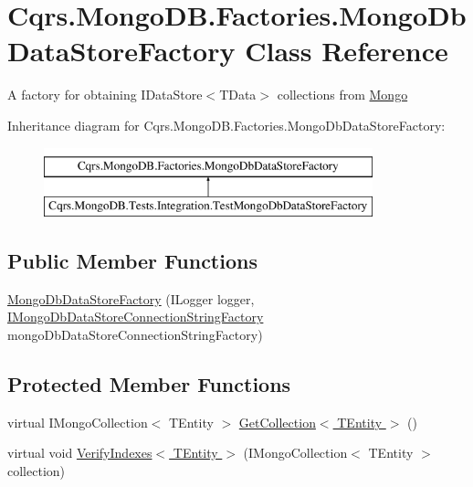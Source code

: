 \hypertarget{classCqrs_1_1MongoDB_1_1Factories_1_1MongoDbDataStoreFactory}{}\section{Cqrs.\+Mongo\+D\+B.\+Factories.\+Mongo\+Db\+Data\+Store\+Factory Class Reference}
\label{classCqrs_1_1MongoDB_1_1Factories_1_1MongoDbDataStoreFactory}


A factory for obtaining I\+Data\+Store$<$\+T\+Data$>$ collections from \hyperlink{namespaceCqrs_1_1Mongo}{Mongo}  


Inheritance diagram for Cqrs.\+Mongo\+D\+B.\+Factories.\+Mongo\+Db\+Data\+Store\+Factory\+:\begin{figure}[H]
\begin{center}
\leavevmode
\includegraphics[height=2.000000cm]{classCqrs_1_1MongoDB_1_1Factories_1_1MongoDbDataStoreFactory}
\end{center}
\end{figure}
\subsection*{Public Member Functions}
\begin{DoxyCompactItemize}
\item 
\hyperlink{classCqrs_1_1MongoDB_1_1Factories_1_1MongoDbDataStoreFactory_a5306704647ba6dab35844231ca999b7e_a5306704647ba6dab35844231ca999b7e}{Mongo\+Db\+Data\+Store\+Factory} (I\+Logger logger, \hyperlink{interfaceCqrs_1_1MongoDB_1_1Factories_1_1IMongoDbDataStoreConnectionStringFactory}{I\+Mongo\+Db\+Data\+Store\+Connection\+String\+Factory} mongo\+Db\+Data\+Store\+Connection\+String\+Factory)
\end{DoxyCompactItemize}
\subsection*{Protected Member Functions}
\begin{DoxyCompactItemize}
\item 
virtual I\+Mongo\+Collection$<$ T\+Entity $>$ \hyperlink{classCqrs_1_1MongoDB_1_1Factories_1_1MongoDbDataStoreFactory_ab1b732065a4369b09851119969a4815f_ab1b732065a4369b09851119969a4815f}{Get\+Collection$<$ T\+Entity $>$} ()
\item 
virtual void \hyperlink{classCqrs_1_1MongoDB_1_1Factories_1_1MongoDbDataStoreFactory_a1be5e7f0670e120c5105ff96d9ce9f82_a1be5e7f0670e120c5105ff96d9ce9f82}{Verify\+Indexes$<$ T\+Entity $>$} (I\+Mongo\+Collection$<$ T\+Entity $>$ collection)
\end{DoxyCompactItemize}
